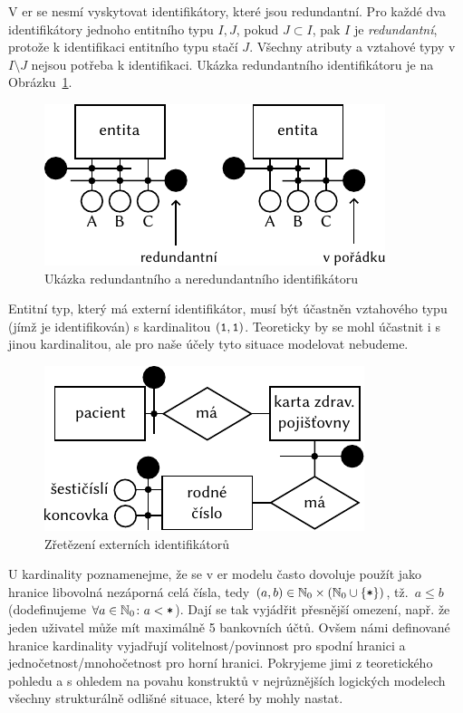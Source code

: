 V \acrshort{er} se nesmí vyskytovat identifikátory, které jsou redundantní.
Pro každé dva identifikátory jednoho entitního typu $I, J$, pokud $J\subset I$, pak $I$ je \emph{redundantní}, protože k identifikaci entitního typu stačí $J$.
Všechny atributy a vztahové typy v $I\setminus J$ nejsou potřeba k identifikaci.
Ukázka redundantního identifikátoru je na Obrázku~\ref{fig:redundant-ids}.

\begin{figure}[!htb]
  \centering
  \includegraphics[width=\maxwidth{\textwidth}]{../img/er-model/redundant-ids.pdf}
  \caption{Ukázka redundantního a neredundantního identifikátoru}
  \label{fig:redundant-ids}
\end{figure}

Entitní typ, který má externí identifikátor, musí být účastněn vztahového typu (jímž je identifikován) s kardinalitou $(\texttt{1}, \texttt{1})$.
Teoreticky by se mohl účastnit i s jinou kardinalitou, ale pro naše účely tyto situace modelovat nebudeme.

\begin{figure}[!htb]
  \centering
  \includegraphics[width=\maxwidth{\textwidth}]{../img/er-model/external-id-chain.pdf}
  \caption{Zřetězení externích identifikátorů}
  \label{fig:er-external-identifier-chain}
\end{figure}

U kardinality poznamenejme, že se v \acrshort{er} modelu často dovoluje použít jako hranice libovolná nezáporná celá čísla, tedy $(a, b)\in \mathbb N_0\times \left(\mathbb N_0 \cup \left\{\texttt{*}\right\}\right)$, tž.~$a\leq b$ (dodefinujeme $\forall a\in\mathbb N_0\colon a < \texttt{*}$).
Dají se tak vyjádřit přesnější omezení, např. že jeden uživatel může mít maximálně 5 bankovních účtů.
Ovšem námi definované hranice kardinality vyjadřují volitelnost/povinnost pro spodní hranici a jednočetnost/mnohočetnost pro horní hranici.
Pokryjeme jimi z teoretického pohledu a s ohledem na povahu konstruktů v nejrůznějších logických modelech všechny strukturálně odlišné situace, které by mohly nastat.

